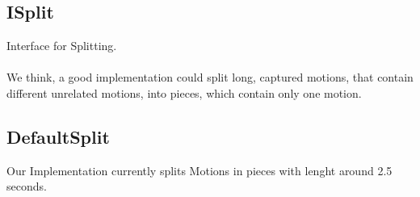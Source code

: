 \documentclass[a4paper,10pt,titlepage,bibliography=totocnumbered]{scrartcl}
\begin{document}
\subsection{ISplit}

Interface for Splitting.
\\\\
We think, a good implementation could split long, captured motions, that contain different unrelated motions, into pieces, which contain only one motion.

\subsection{DefaultSplit}

Our Implementation currently splits Motions in pieces with lenght around 2.5 seconds.


 
\end{document}

